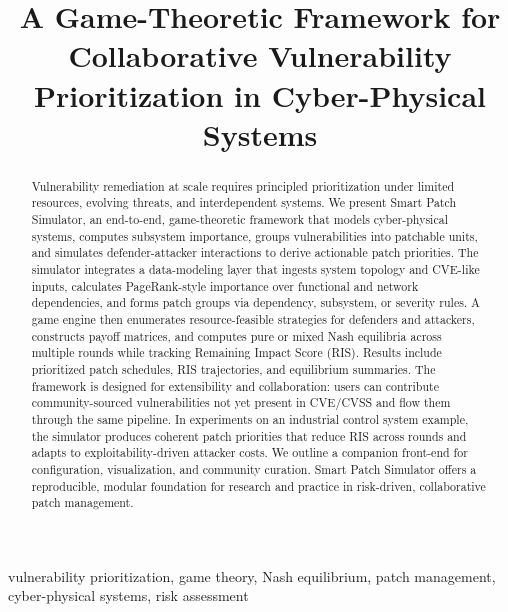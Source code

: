 \documentclass[conference]{IEEEtran}
\begin{document}
\title{A Game-Theoretic Framework for Collaborative Vulnerability Prioritization in Cyber-Physical Systems}

\author{
}

\maketitle

\begin{abstract}
Vulnerability remediation at scale requires principled prioritization under limited resources, evolving threats, and interdependent systems. We present Smart Patch Simulator, an end-to-end, game-theoretic framework that models cyber-physical systems, computes subsystem importance, groups vulnerabilities into patchable units, and simulates defender-attacker interactions to derive actionable patch priorities. The simulator integrates a data-modeling layer that ingests system topology and CVE-like inputs, calculates PageRank-style importance over functional and network dependencies, and forms patch groups via dependency, subsystem, or severity rules. A game engine then enumerates resource-feasible strategies for defenders and attackers, constructs payoff matrices, and computes pure or mixed Nash equilibria across multiple rounds while tracking Remaining Impact Score (RIS). Results include prioritized patch schedules, RIS trajectories, and equilibrium summaries. The framework is designed for extensibility and collaboration: users can contribute community-sourced vulnerabilities not yet present in CVE/CVSS and flow them through the same pipeline. In experiments on an industrial control system example, the simulator produces coherent patch priorities that reduce RIS across rounds and adapts to exploitability-driven attacker costs. We outline a companion front-end for configuration, visualization, and community curation. Smart Patch Simulator offers a reproducible, modular foundation for research and practice in risk-driven, collaborative patch management.
\end{abstract}

\begin{IEEEkeywords}
vulnerability prioritization, game theory, Nash equilibrium, patch management, cyber-physical systems, risk assessment
\end{IEEEkeywords}
\end{document}
